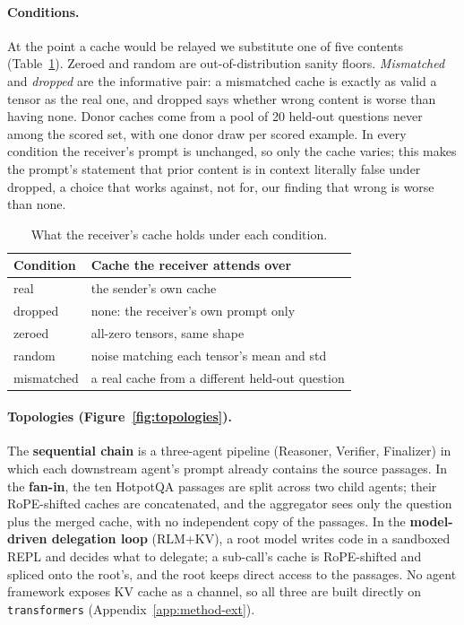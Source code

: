 \documentclass[11pt]{article}
\begin{document}
\paragraph{Conditions.} At the point a cache would be relayed we
substitute one of five contents (Table~\ref{tab:conditions}). Zeroed and
random are out-of-distribution sanity floors. \emph{Mismatched} and
\emph{dropped} are the informative pair: a mismatched cache is exactly as
valid a tensor as the real one, and dropped says whether wrong content is
worse than having none. Donor caches come from a pool of 20 held-out
questions never among the scored set, with one donor draw per scored
example. In every condition the receiver's prompt is unchanged, so only
the cache varies; this makes the prompt's statement that prior content is
in context literally false under dropped, a choice that works against,
not for, our finding that wrong is worse than none.

\begin{table}[t]
\centering
\small
\caption{What the receiver's cache holds under each condition.}
\label{tab:conditions}
\begin{tabular}{lp{5.2cm}}
\toprule
\textbf{Condition} & \textbf{Cache the receiver attends over} \\
\midrule
real       & the sender's own cache \\
dropped    & none: the receiver's own prompt only \\
zeroed     & all-zero tensors, same shape \\
random     & noise matching each tensor's mean and std \\
mismatched & a real cache from a different held-out question \\
\bottomrule
\end{tabular}
\end{table}

\paragraph{Topologies (Figure~\ref{fig:topologies}).} The \textbf{sequential chain} is a three-agent
pipeline (Reasoner, Verifier, Finalizer) in which each downstream agent's
prompt already contains the source passages. In the \textbf{fan-in}, the
ten HotpotQA passages are split across two child agents; their
RoPE-shifted caches are concatenated, and the aggregator sees only the
question plus the merged cache, with no independent copy of the passages.
In the \textbf{model-driven delegation loop} (RLM+KV), a root model writes
code in a sandboxed REPL and decides what to delegate; a sub-call's cache
is RoPE-shifted and spliced onto the root's, and the root keeps direct
access to the passages. No agent framework exposes KV cache as a
channel, so all three are built directly on \texttt{transformers}
\citep{transformers2020} (Appendix~\ref{app:method-ext}).
\end{document}
